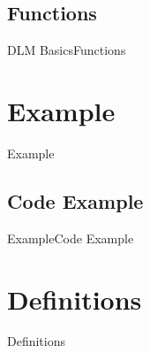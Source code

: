 \documentclass[10pt]{beamer}
\begin{document}
\subsection{Functions}
\begin{frame}{DLM Basics}{Functions}
\end{frame}

\section{Example}
\begin{frame}{Example}{}
\end{frame}

\subsection{Code Example}
\begin{frame}{Example}{Code Example}
\end{frame}

\section{Definitions}
\begin{frame}{Definitions}{}
\end{frame}


{\aauwavesbg
\begin{frame}
\end{frame}}
\end{document}
